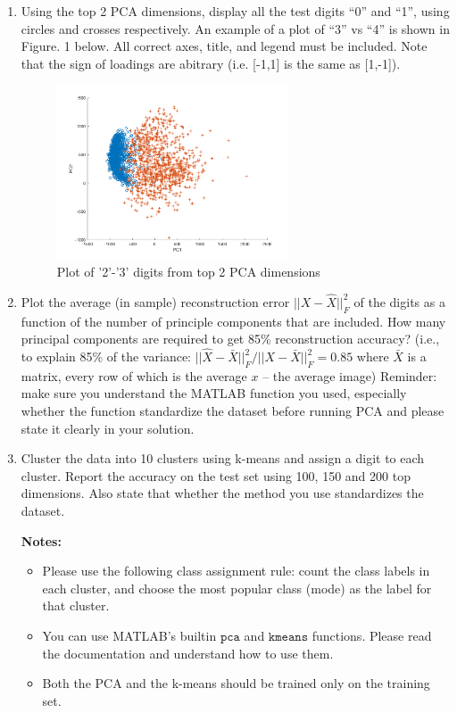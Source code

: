 \begin{enumerate}

\item {} Using the top 2 PCA dimensions, display all the test
  digits ``0'' and ``1'', using circles and crosses respectively.
  An example of a plot of ``3'' vs ``4'' is shown in Figure. 1 below. All correct axes, title, and legend must be included.
  Note that the sign of loadings are abitrary (i.e. [-1,1] is the same as [1,-1]).

  \begin{figure}[h!]
    \centering
    \includegraphics[width=0.65\textwidth]{images/pca_2_vs_3}
    \caption{Plot of '2'-'3' digits from top 2 PCA
        dimensions}\label{fig:pca_2_vs_3}
  \end{figure}
  

\item {} Plot the average (in sample) reconstruction error  $||X - \hat{X}||_F^2$
of the digits as a function of the number of principle components that are included.  How many
principal components are required to get 85\% reconstruction accuracy? (i.e., to explain 85\% of the 
variance: $||\hat{X}-\bar{X}||_F^2/ ||X - \bar{X}||_F^2 = 0.85$ where $\bar{X}$ is a matrix, every row of which is the
average $x$ -- the average image)  
Reminder: make sure you understand the MATLAB function you used, especially whether the function standardize the dataset before running PCA 
and please state it clearly in your solution.


\item {} Cluster the data into 10 clusters using k-means and assign a digit to each cluster.
Report the accuracy on the test set using 100, 150 and 200 top dimensions.
Also state that whether the method you use standardizes the dataset. 

\textbf{Notes:}
  \begin{itemize} 
  \item Please use the following class assignment rule: count the class labels in each cluster, and choose the most popular class (mode) as the label for that cluster.
  \item You can use MATLAB's builtin \(\mathtt{pca}\) and \(\mathtt{kmeans}\) functions. Please read the documentation and understand how to use them.
  \item Both the PCA and the k-means should be trained only on the training set.
  \end{itemize}


\end{enumerate}
